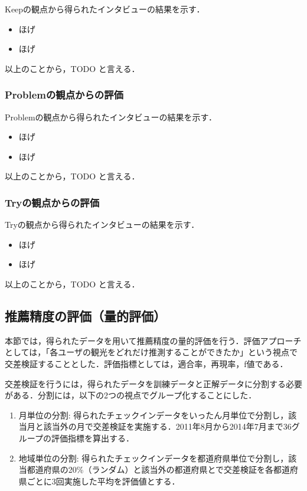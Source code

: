 \documentclass{jsarticle}
\begin{document}
Keepの観点から得られたインタビューの結果を示す．

\begin{itemize}
\item ほげ
\item ほげ
\end{itemize}

以上のことから，TODO と言える．

\subsubsection{Problemの観点からの評価}

Problemの観点から得られたインタビューの結果を示す．

\begin{itemize}
\item ほげ
\item ほげ
\end{itemize}

以上のことから，TODO と言える．

\subsubsection{Tryの観点からの評価}

Tryの観点から得られたインタビューの結果を示す．

\begin{itemize}
\item ほげ
\item ほげ
\end{itemize}

以上のことから，TODO と言える．

\subsection{推薦精度の評価（量的評価）}

本節では，得られたデータを用いて推薦精度の量的評価を行う．評価アプローチとしては，「各ユーザの観光をどれだけ推測することができたか」という視点で交差検証することとした．評価指標としては，適合率，再現率，f値である．

交差検証を行うには，得られたデータを訓練データと正解データに分割する必要がある．分割には，以下の2つの視点でグループ化することにした．

\begin{enumerate}
\item 月単位の分割: 得られたチェックインデータをいったん月単位で分割し，該当月と該当外の月で交差検証を実施する．2011年8月から2014年7月まで36グループの評価指標を算出する．
\item 地域単位の分割: 得られたチェックインデータを都道府県単位で分割し，該当都道府県の20\%（ランダム）と該当外の都道府県とで交差検証を各都道府県ごとに3回実施した平均を評価値とする．
\end{enumerate}
\end{document}
